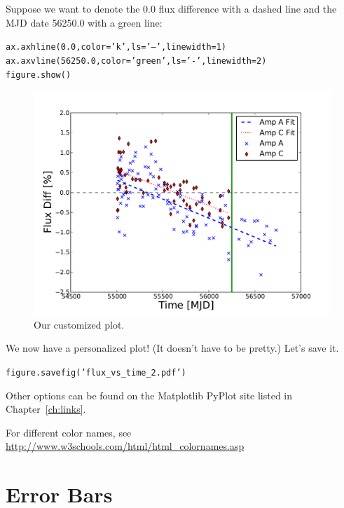 Suppose we want to denote the 0.0 flux difference with a dashed line and the
MJD date 56250.0 with a green line:

\begin{alltt}
\pytab ax.axhline(0.0, color='k', ls='--', linewidth=1)  
\pytab ax.axvline(56250.0, color='green', ls='-', linewidth=2) 
\pytab figure.show()
\end{alltt}

\begin{figure}[tbp]
  \centering
    \includegraphics[scale=0.55]{flux_vs_time_2.pdf}
    \caption{Our customized plot.}
  \label{fig:flux_vs_time_2}
\end{figure}

We now have a personalized plot! (It doesn't have to be pretty.) Let's save it.

\begin{alltt}
\pytab figure.savefig('flux_vs_time_2.pdf')
\end{alltt}

Other options can be found on the Matplotlib PyPlot site listed in Chapter~\ref{ch:links}. 

For different color names, see \href{http://www.w3schools.com/html/html_colornames.asp}
{http://www.w3schools.com/html/html\_colornames.asp}



\section{Error Bars}

